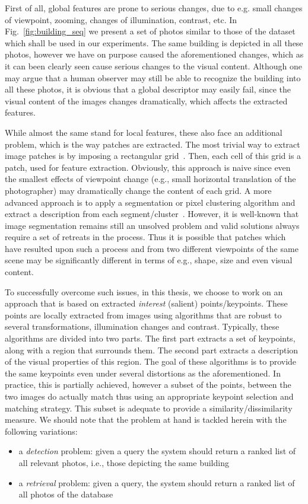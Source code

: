 First of all, global features are prone to serious changes, due to e.g. small changes of viewpoint, zooming, changes of illumination, contrast, etc. In Fig.~\ref{fig:building_seq} we present a set of photos similar to those of the dataset which shall be used in our experiments. The same building is depicted in all these photos, however we have on purpose caused the aforementioned changes, which as it can been clearly seen cause serious changes to the visual content. Although one may argue that a human observer may still be able to recognize the building into all these photos, it is obvious that a global descriptor may easily fail, since the visual content of the images changes dramatically, which affects the extracted features.


While almost the same stand for local features, these also face an additional problem, which is the way patches are extracted. The most trivial way to extract image patches is by imposing a rectangular grid~\cite{kasutani2001mpeg}. Then, each cell of this grid is a patch, used for feature extraction. Obviously, this approach is naive since even the smallest effects of viewpoint change (e.g., small horizontal translation of the photographer) may dramatically change the content of each grid. A more advanced approach is to apply a segmentation or pixel clustering algorithm and extract a description from each segment/cluster~\cite{spyrou2009concept}. However, it is well-known that image segmentation remains still an unsolved problem and valid solutions always require a set of retreats in the process. Thus it is possible that patches which have resulted  upon such a process and from two different viewpoints of the same scene may be significantly different in terms of e.g., shape, size and even visual content. 

To successfully overcome such issues, in this thesis, we choose to work on an approach that is based on extracted \textit{interest} (salient) points/keypoints. These points are locally extracted from images using algorithms that are robust to several transformations, illumination changes and contrast. Typically, these algorithms are divided into two parts. The first part extracts a set of keypoints, along with a region that surrounds them. The second part extracts a description of the visual properties of this region. The goal of these algorithms is to provide the same keypoints even under several distortions as the aforementioned. In practice, this is
partially achieved, however a subset of the points, between the two images do actually match thus using an appropriate keypoint selection and matching strategy. 
This subset is adequate to provide a similarity/dissimilarity measure. We should note that the problem at hand is tackled herein with the following variations:
\begin{itemize}
    \item a \textit{detection} problem: given a query the system should return a ranked list of all relevant photos, i.e., those depicting the same building
    \item a \textit{retrieval} problem: given a query, the system should return a ranked list of all photos of the database
\end{itemize}

